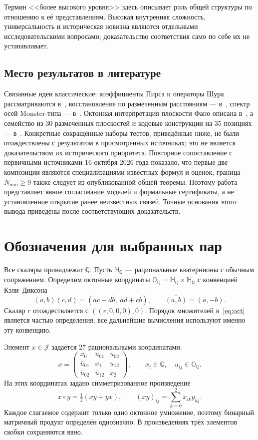 \documentclass[11pt,a4paper]{article}
\numberwithin{equation}{section}
\theoremstyle{definition}
\theoremstyle{remark}
\newcommand{\QQ}{\mathbb{Q}}
\newcommand{\HH}{\mathbb{H}_{\QQ}}
\newcommand{\OO}{\mathbb{O}_{\QQ}}
\newcommand{\J}{\mathcal{J}}
\begin{document}
Термин <<более высокого уровня>> здесь описывает роль общей структуры
по отношению к её представлениям. Высокая внутренняя сложность,
универсальность и историческая новизна являются отдельными
исследовательскими вопросами; доказательство соответствия само по
себе их не устанавливает.

\subsection{Место результатов в литературе}
Связанные идеи классические: коэффициенты Пирса и операторы Шура
рассматриваются в~\cite{gowda}, восстановление по размеченным расстояниям
--- в~\cite{dokmanic}, спектр осей Monster-типа --- в~\cite{mcinroy}.
Октонная интерпретация плоскости Фано описана в~\cite{baez}, а семейство
из 30 размеченных плоскостей и кодовые конструкции на 35 позициях
--- в~\cite{liebler}. Конкретные сокращённые наборы тестов, приведённые
ниже, не были отождествлены с результатом в просмотренных источниках;
это не является доказательством их исторического приоритета.
Повторное сопоставление с первичными источниками 16 октября 2026 года
показало, что первые две композиции являются специализациями известных
формул и оценок; граница $N_{\min}\ge9$ также следует из опубликованной
общей теоремы. Поэтому работа представляет явное согласование моделей
и формальные сертификаты, а не установленное открытие ранее неизвестных
связей. Точные основания этого вывода приведены после соответствующих
доказательств.

\section{Обозначения для выбранных пар}\label{sec:model}
Все скаляры принадлежат $\QQ$. Пусть $\HH$ --- рациональные кватернионы
с обычным сопряжением. Определим октонные координаты
$\OO=\HH\times\HH$ с конвенцией Кэли--Диксона
\begin{equation}\label{eq:oct}
 (a,b)(c,d)=(ac-d\bar b,\;\bar a d+cb),
 \qquad \overline{(a,b)}=(\bar a,-b).
\end{equation}
Скаляр $r$ отождествляется с $((r,0,0,0),0)$.
Порядок множителей в~\eqref{eq:oct} является частью определения;
все дальнейшие вычисления используют именно эту конвенцию.

Элемент $x\in\J$ задаётся 27 рациональными координатами:
\begin{equation}\label{eq:matrix}
 x=\begin{pmatrix}
 x_0 & u_{01} & u_{02}\\
 \bar u_{01} & x_1 & u_{12}\\
 \bar u_{02} & \bar u_{12} & x_2
 \end{pmatrix},
 \qquad x_i\in\QQ,\quad u_{ij}\in\OO.
\end{equation}
На этих координатах задано симметризованное произведение
\begin{equation}\label{eq:jordan}
 x\circ y=\tfrac12(xy+yx),\qquad
 (xy)_{ij}=\sum_{k=0}^{2}x_{ik}y_{kj}.
\end{equation}
Каждое слагаемое содержит только одно октонное умножение, поэтому
бинарный матричный продукт определён однозначно. В произведениях
трёх элементов скобки сохраняются явно.
\end{document}
